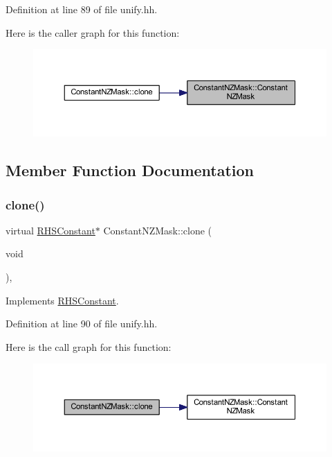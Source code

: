 Definition at line 89 of file unify.\+hh.

Here is the caller graph for this function\+:
\nopagebreak
\begin{figure}[H]
\begin{center}
\leavevmode
\includegraphics[width=350pt]{class_constant_n_z_mask_abc9078d3e2a217a20e6feece90c72e95_icgraph}
\end{center}
\end{figure}


\subsection{Member Function Documentation}
\mbox{\label{class_constant_n_z_mask_aa7255ee306a332b4b3cb8b606f8c3821}} 
\subsubsection{\texorpdfstring{clone()}{clone()}}
{\footnotesize\ttfamily virtual \mbox{\hyperlink{class_r_h_s_constant}{R\+H\+S\+Constant}}$\ast$ Constant\+N\+Z\+Mask\+::clone (\begin{DoxyParamCaption}\item[{void}]{ }\end{DoxyParamCaption})\hspace{0.3cm}{\ttfamily [inline]}, {\ttfamily [virtual]}}



Implements \mbox{\hyperlink{class_r_h_s_constant_a3e43335a89351a453932a8c0544d5722}{R\+H\+S\+Constant}}.



Definition at line 90 of file unify.\+hh.

Here is the call graph for this function\+:
\nopagebreak
\begin{figure}[H]
\begin{center}
\leavevmode
\includegraphics[width=350pt]{class_constant_n_z_mask_aa7255ee306a332b4b3cb8b606f8c3821_cgraph}
\end{center}
\end{figure}
\mbox{\label{class_constant_n_z_mask_a25a783d0e2e3c6f48959941fb28a60b6}} 
